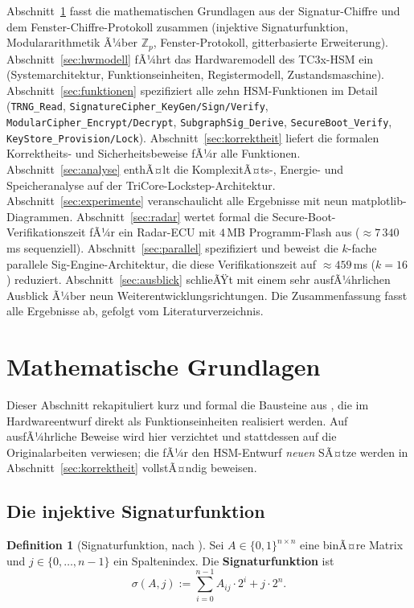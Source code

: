 ﻿\documentclass[a4paper,12pt]{article}
\theoremstyle{definition}
\newtheorem{definition}{Definition}
\begin{document}
Abschnitt~\ref{sec:grundlagen} fasst die mathematischen Grundlagen aus der Signatur-Chiffre und dem Fenster-Chiffre-Protokoll zusammen (injektive Signaturfunktion, Modulararithmetik Ã¼ber $\mathbb{Z}_p$, Fenster-Protokoll, gitterbasierte Erweiterung). Abschnitt~\ref{sec:hwmodell} fÃ¼hrt das Hardwaremodell des TC3x-HSM ein (Systemarchitektur, Funktionseinheiten, Registermodell, Zustandsmaschine). Abschnitt~\ref{sec:funktionen} spezifiziert alle zehn HSM-Funktionen im Detail (\texttt{TRNG\_Read}, \texttt{SignatureCipher\_KeyGen/Sign/Verify}, \texttt{ModularCipher\_Encrypt/Decrypt}, \texttt{SubgraphSig\_Derive}, \texttt{SecureBoot\_Verify}, \texttt{KeyStore\_Provision/Lock}). Abschnitt~\ref{sec:korrektheit} liefert die formalen Korrektheits- und Sicherheitsbeweise fÃ¼r alle Funktionen. Abschnitt~\ref{sec:analyse} enthÃ¤lt die KomplexitÃ¤ts-, Energie- und Speicheranalyse auf der TriCore-Lockstep-Architektur. Abschnitt~\ref{sec:experimente} veranschaulicht alle Ergebnisse mit neun matplotlib-Diagrammen. Abschnitt~\ref{sec:radar} wertet formal die Secure-Boot-Verifikationszeit fÃ¼r ein Radar-ECU mit $4$\,MB Programm-Flash aus ($\approx 7\,340$\,ms sequenziell). Abschnitt~\ref{sec:parallel} spezifiziert und beweist die $k$-fache parallele Sig-Engine-Architektur, die diese Verifikationszeit auf $\approx 459$\,ms ($k=16$) reduziert. Abschnitt~\ref{sec:ausblick} schlieÃŸt mit einem sehr ausfÃ¼hrlichen Ausblick Ã¼ber neun Weiterentwicklungsrichtungen. Die Zusammenfassung fasst alle Ergebnisse ab, gefolgt vom Literaturverzeichnis.


\section{Mathematische Grundlagen}
\label{sec:grundlagen}

Dieser Abschnitt rekapituliert kurz und formal die Bausteine aus \cite{Epp26b,Epp26c,Epp26a}, die im Hardwareentwurf direkt als Funktionseinheiten realisiert werden. Auf ausfÃ¼hrliche Beweise wird hier verzichtet und stattdessen auf die Originalarbeiten verwiesen; die fÃ¼r den HSM-Entwurf \emph{neuen} SÃ¤tze werden in Abschnitt~\ref{sec:korrektheit} vollstÃ¤ndig beweisen.

\subsection{Die injektive Signaturfunktion}

\begin{definition}[Signaturfunktion, nach \cite{Epp26a,Epp26b}]
	\label{def:sigma}
	Sei $A \in \{0,1\}^{n \times n}$ eine binÃ¤re Matrix und $j \in \{0,\ldots,n-1\}$ ein Spaltenindex. Die \textbf{Signaturfunktion} ist
	\[
	\sigma(A, j) := \sum_{i=0}^{n-1} A_{ij} \cdot 2^i + j \cdot 2^n.
	\]
\end{definition}
\end{document}
